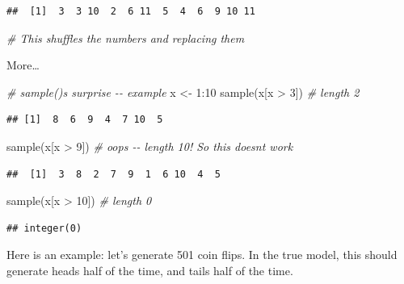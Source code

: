\documentclass[
]{book}
\newenvironment{Shaded}{\begin{snugshade}}{\end{snugshade}}
\newcommand{\CommentTok}[1]{\textcolor[rgb]{0.56,0.35,0.01}{\textit{#1}}}
\newcommand{\DecValTok}[1]{\textcolor[rgb]{0.00,0.00,0.81}{#1}}
\newcommand{\FunctionTok}[1]{\textcolor[rgb]{0.00,0.00,0.00}{#1}}
\newcommand{\NormalTok}[1]{#1}
\newcommand{\OtherTok}[1]{\textcolor[rgb]{0.56,0.35,0.01}{#1}}
\newcommand{\SpecialCharTok}[1]{\textcolor[rgb]{0.00,0.00,0.00}{#1}}
\theoremstyle{definition}
\theoremstyle{definition}
\theoremstyle{definition}
\theoremstyle{definition}
\theoremstyle{remark}
\begin{document}
\begin{verbatim}
##  [1]  3  3 10  2  6 11  5  4  6  9 10 11
\end{verbatim}

\begin{Shaded}
\begin{Highlighting}[]
\CommentTok{\# This shuffles the numbers and replacing them}
\end{Highlighting}
\end{Shaded}

More\ldots{}

\begin{Shaded}
\begin{Highlighting}[]
\CommentTok{\# sample()\textquotesingle{}s surprise {-}{-} example}
\NormalTok{x }\OtherTok{\textless{}{-}} \DecValTok{1}\SpecialCharTok{:}\DecValTok{10}
    \FunctionTok{sample}\NormalTok{(x[x }\SpecialCharTok{\textgreater{}}  \DecValTok{3}\NormalTok{]) }\CommentTok{\# length 2}
\end{Highlighting}
\end{Shaded}

\begin{verbatim}
## [1]  8  6  9  4  7 10  5
\end{verbatim}

\begin{Shaded}
\begin{Highlighting}[]
    \FunctionTok{sample}\NormalTok{(x[x }\SpecialCharTok{\textgreater{}}  \DecValTok{9}\NormalTok{]) }\CommentTok{\# oops {-}{-} length 10!  So this doesn\textquotesingle{}t work}
\end{Highlighting}
\end{Shaded}

\begin{verbatim}
##  [1]  3  8  2  7  9  1  6 10  4  5
\end{verbatim}

\begin{Shaded}
\begin{Highlighting}[]
    \FunctionTok{sample}\NormalTok{(x[x }\SpecialCharTok{\textgreater{}} \DecValTok{10}\NormalTok{]) }\CommentTok{\# length 0}
\end{Highlighting}
\end{Shaded}

\begin{verbatim}
## integer(0)
\end{verbatim}

Here is an example: let's generate 501 coin flips. In the true model, this should generate heads half of the time, and tails half of the time.
\end{document}
